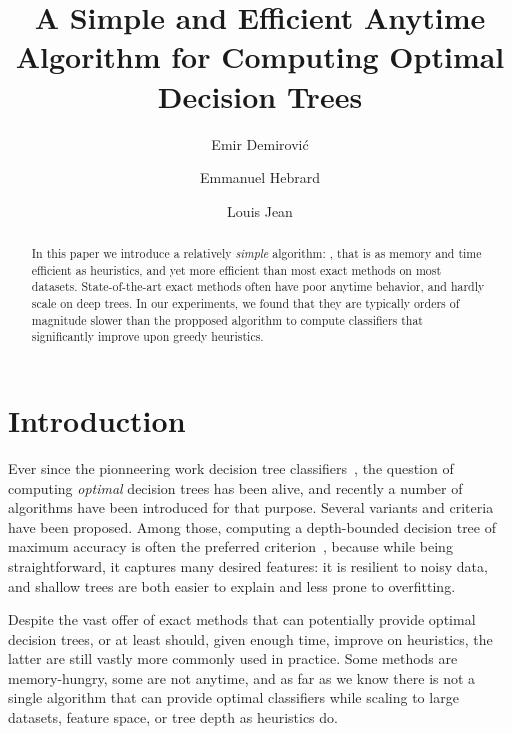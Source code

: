 \documentclass{llncs}
\title{A Simple and Efficient Anytime Algorithm for Computing Optimal Decision Trees}
\author{Emir Demirovi\'c\inst{1} \and Emmanuel Hebrard\inst{2} \and Louis Jean\inst{2}}
\institute{TU DELFT, The Netherlands, email: e.demirovic@tudelft.nl
  \and LAAS-CNRS, Universit\'e de Toulouse, CNRS, France, email: \{hebrard,ljean\}@laas.fr}
\begin{document}
\maketitle






\begin{abstract}
	In this paper we introduce a relatively \emph{simple} algorithm: \budalg, that is as memory and time efficient as heuristics, and yet more efficient than most exact methods on most datasets. State-of-the-art exact methods often have poor anytime behavior, and hardly scale on deep trees. In our experiments, we found that they are typically orders of magnitude slower than the propposed algorithm to compute classifiers that significantly improve upon greedy heuristics. 
\end{abstract}

\section{Introduction}

Ever since the pionneering work decision tree classifiers~\cite{breiman1984classification,10.1023/A:1022643204877}, the question of computing \emph{optimal} decision trees has been alive, and recently a number of algorithms have been introduced for that purpose.
Several variants and criteria have been proposed. %
Among those, computing a depth-bounded decision tree of maximum accuracy is often the preferred criterion~\cite{bertsimas2017optimal,hu2019optimal,dl8,verhaeghe2019learning}, because while being straightforward, it captures many desired features: it is resilient to noisy data, and shallow trees are both easier to explain and less prone to overfitting.

\medskip

Despite the vast offer of exact methods that can potentially provide optimal decision trees, or at least should, given enough time, improve on heuristics, the latter are still vastly more commonly used in practice. Some methods are memory-hungry, some are not anytime, and as far as we know there is not a single algorithm that can provide optimal classifiers while scaling to large datasets, feature space, or tree depth as heuristics do.
\end{document}
